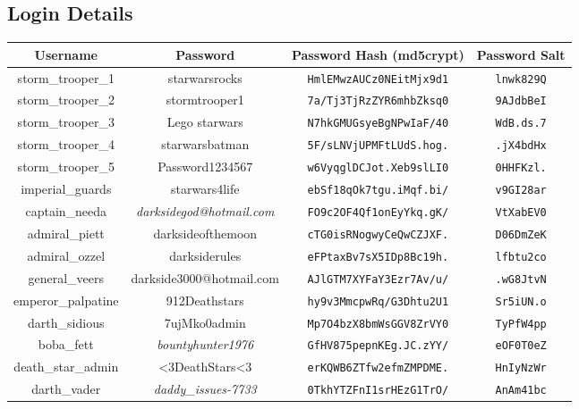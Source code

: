 \documentclass{article}
\begin{document}
\subsection{Login Details}
\label{subsec:login_details}
\begin{adjustwidth}{-1.5cm}{}
\begin{tabular}{ |c|c|c|c| }
\hline
\textbf{Username} & \textbf{Password} & \textbf{Password Hash (md5crypt)} & \textbf{Password Salt} \\
\hline
storm\_trooper\_1 & starwarsrocks & \texttt{HmlEMwzAUCz0NEitMjx9d1} & \texttt{lnwk829Q} \\
\hline
storm\_trooper\_2 & stormtrooper1 & \texttt{7a/Tj3TjRzZYR6mhbZksq0} & \texttt{9AJdbBeI} \\
\hline
storm\_trooper\_3 & Lego starwars & \texttt{N7hkGMUGsyeBgNPwIaF/40} & \texttt{WdB.ds.7} \\
\hline
storm\_trooper\_4 & starwarsbatman & \texttt{5F/sLNVjUPMFtLUdS.hog.} & \texttt{.jX4bdHx} \\
\hline
storm\_trooper\_5 & Password1234567 & \texttt{w6VyqglDCJot.Xeb9slLI0} & \texttt{0HHFKzl.} \\
\hline
imperial\_guards & starwars4life & \texttt{ebSf18qOk7tgu.iMqf.bi/} & \texttt{v9GI28ar} \\
\hline
captain\_needa & \emph{darksidegod@hotmail.com} & \texttt{FO9c2OF4Qf1onEyYkq.gK/} & \texttt{VtXabEV0} \\
\hline
admiral\_piett & darksideofthemoon & \texttt{cTG0isRNogwyCeQwCZJXF.} & \texttt{D06DmZeK} \\
\hline
admiral\_ozzel & darksiderules & \texttt{eFPtaxBv7sX5IDp8Bc19h.} & \texttt{lfbtu2co} \\
\hline
general\_veers & darkside3000@hotmail.com & \texttt{AJlGTM7XYFaY3Ezr7Av/u/} & \texttt{.wG8JtvN} \\
\hline
emperor\_palpatine & 912Deathstars & \texttt{hy9v3MmcpwRq/G3Dhtu2U1} & \texttt{Sr5iUN.o} \\
\hline
darth\_sidious & 7ujMko0admin & \texttt{Mp7O4bzX8bmWsGGV8ZrVY0} & \texttt{TyPfW4pp} \\
\hline
boba\_fett & \emph{bountyhunter1976} & \texttt{GfHV875pepnKEg.JC.zYY/} & \texttt{eOF0T0eZ} \\
\hline
death\_star\_admin & \textless 3DeathStars\textless 3 & \texttt{erKQWB6ZTfw2efmZMPDME.} & \texttt{HnIyNzWr} \\
\hline
darth\_vader & \emph{daddy\_issues-7733} & \texttt{0TkhYTZFnI1srHEzG1TrO/} & \texttt{AnAm41bc} \\
\hline
\end{tabular}
\end{adjustwidth}
\end{document}
